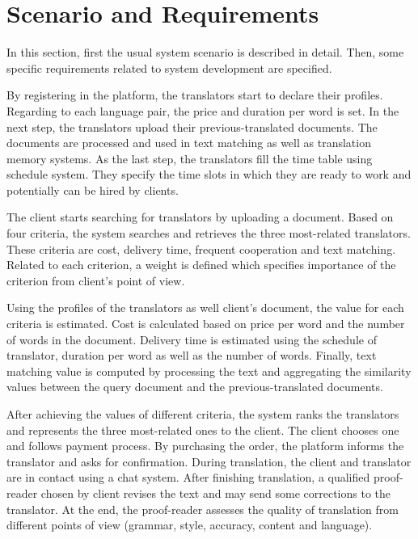 \section{Scenario and Requirements}
\label{sec:scenario}
In this section, first the usual system scenario is described in detail. Then, some specific requirements related to system development are specified.

By registering in the platform, the translators start to declare their profiles. Regarding to each language pair, the price and duration per word is set. In the next step, the translators upload their previous-translated documents. The documents are processed and used in text matching as well as  translation memory systems. As the last step, the translators fill the time table using schedule system. They specify the time slots in which they are ready to work and potentially can be hired by clients.

The client starts searching for translators by uploading a document. Based on four criteria, the system searches and retrieves the three most-related translators. These criteria are cost, delivery time, frequent cooperation and text matching. Related to each criterion, a weight is defined which specifies importance of the criterion from client's point of view.

Using the profiles of the translators as well client's document, the value for each criteria is estimated. Cost is calculated based on price per word and the number of words in the document. Delivery time is estimated using the schedule of translator, duration per word as well as the number of words. Finally, text matching value is computed by processing the text and aggregating the similarity values between the query document and the previous-translated documents.

After achieving the values of different criteria, the system ranks the translators and represents the three most-related ones to the client. The client chooses one and follows payment process. By purchasing the order, the platform informs the translator and asks for confirmation. During translation, the client and translator are in contact using a chat system. After finishing translation, a qualified proof-reader chosen by client revises the text and may send some corrections to the translator. At the end, the proof-reader assesses the quality of translation from different points of view (grammar, style, accuracy, content and language).

